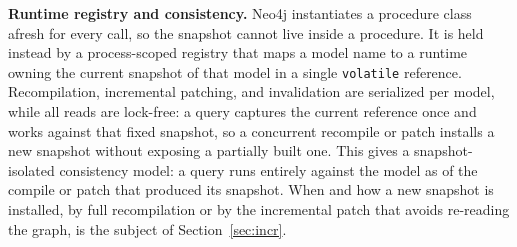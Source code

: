 \noindent\textbf{Runtime registry and consistency.} Neo4j instantiates a
procedure class afresh for every call, so the snapshot cannot live inside a
procedure. It is held instead by a process-scoped registry that maps a model
name to a runtime owning the current snapshot of that model in a single
\texttt{volatile} reference. Recompilation, incremental patching, and
invalidation are serialized per model, while all reads are lock-free: a query
captures the current reference once and works against that fixed snapshot,
so a concurrent recompile or patch installs a new snapshot without exposing a
partially built one. This gives a snapshot-isolated consistency model: a
query runs entirely against the model as of the compile or patch that
produced its snapshot. When and how a new snapshot is installed, by full
recompilation or by the incremental patch that avoids re-reading the graph,
is the subject of Section~\ref{sec:incr}.
